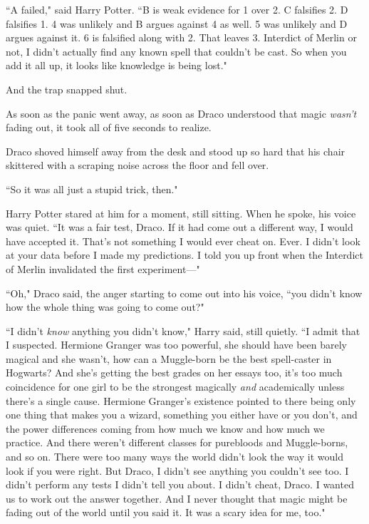 \vspace{1\baselineskip}

``A failed," said Harry Potter. ``B is weak evidence for 1 over 2. C falsifies 2. D falsifies 1. 4 was unlikely and B argues against 4 as well. 5 was unlikely and D argues against it. 6 is falsified along with 2. That leaves 3. Interdict of Merlin or not, I didn't actually find any known spell that couldn't be cast. So when you add it all up, it looks like knowledge is being lost."

And the trap snapped shut.

As soon as the panic went away, as soon as Draco understood that magic \emph{wasn't} fading out, it took all of five seconds to realize.

Draco shoved himself away from the desk and stood up so hard that his chair skittered with a scraping noise across the floor and fell over.

``So it was all just a stupid trick, then."

Harry Potter stared at him for a moment, still sitting. When he spoke, his voice was quiet. ``It was a fair test, Draco. If it had come out a different way, I would have accepted it. That's not something I would ever cheat on. Ever. I didn't look at your data before I made my predictions. I told you up front when the Interdict of Merlin invalidated the first experiment—"

``Oh," Draco said, the anger starting to come out into his voice, ``you didn't know how the whole thing was going to come out?"

``I didn't \emph{know} anything you didn't know," Harry said, still quietly. ``I admit that I suspected. Hermione Granger was too powerful, she should have been barely magical and she wasn't, how can a Muggle-born be the best spell-caster in Hogwarts? And she's getting the best grades on her essays too, it's too much coincidence for one girl to be the strongest magically \emph{and} academically unless there's a single cause. Hermione Granger's existence pointed to there being only one thing that makes you a wizard, something you either have or you don't, and the power differences coming from how much we know and how much we practice. And there weren't different classes for purebloods and Muggle-borns, and so on. There were too many ways the world didn't look the way it would look if you were right. But Draco, I didn't see anything you couldn't see too. I didn't perform any tests I didn't tell you about. I didn't cheat, Draco. I wanted us to work out the answer together. And I never thought that magic might be fading out of the world until you said it. It was a scary idea for me, too."

